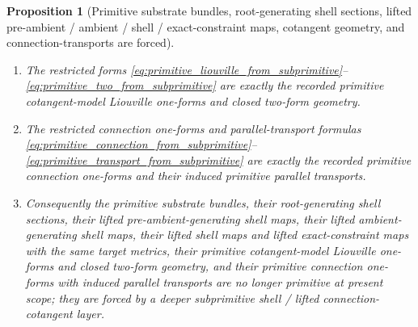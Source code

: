 \documentclass[11pt]{article}
\newtheorem{proposition}{Proposition}
\begin{document}
\begin{proposition}[Primitive substrate bundles, root-generating shell sections, lifted pre-ambient / ambient / shell / exact-constraint maps, cotangent geometry, and connection-transports are forced]
\begin{enumerate}
    \item The restricted forms \eqref{eq:primitive_liouville_from_subprimitive}--\eqref{eq:primitive_two_from_subprimitive} are exactly the recorded primitive cotangent-model Liouville one-forms and closed two-form geometry.
    \item The restricted connection one-forms and parallel-transport formulas \eqref{eq:primitive_connection_from_subprimitive}--\eqref{eq:primitive_transport_from_subprimitive} are exactly the recorded primitive connection one-forms and their induced primitive parallel transports.
    \item Consequently the primitive substrate bundles, their root-generating shell sections, their lifted pre-ambient-generating shell maps, their lifted ambient-generating shell maps, their lifted shell maps and lifted exact-constraint maps with the same target metrics, their primitive cotangent-model Liouville one-forms and closed two-form geometry, and their primitive connection one-forms with induced parallel transports are no longer primitive at present scope; they are forced by a deeper subprimitive shell / lifted connection-cotangent layer.
\end{enumerate}
\end{proposition}
\end{document}
